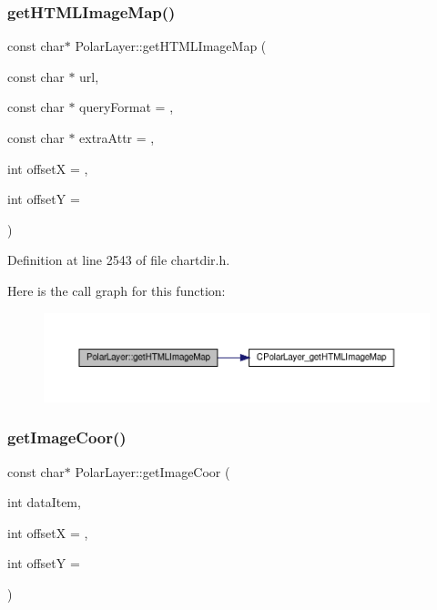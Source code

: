 \subsubsection{\texorpdfstring{get\+H\+T\+M\+L\+Image\+Map()}{getHTMLImageMap()}}
{\footnotesize\ttfamily const char$\ast$ Polar\+Layer\+::get\+H\+T\+M\+L\+Image\+Map (\begin{DoxyParamCaption}\item[{const char $\ast$}]{url,  }\item[{const char $\ast$}]{query\+Format = {},  }\item[{const char $\ast$}]{extra\+Attr = {},  }\item[{int}]{offsetX = {},  }\item[{int}]{offsetY = {} }\end{DoxyParamCaption})\hspace{0.3cm}{\ttfamily [inline]}}



Definition at line 2543 of file chartdir.\+h.

Here is the call graph for this function\+:
\nopagebreak
\begin{figure}[H]
\begin{center}
\leavevmode
\includegraphics[width=350pt]{class_polar_layer_aa9ce8e1ae886b67e135b1723ba00b745_cgraph}
\end{center}
\end{figure}
\mbox{\label{class_polar_layer_a06d7ebff644bdcbae6381e8d37d5a5bf}} 
\subsubsection{\texorpdfstring{get\+Image\+Coor()}{getImageCoor()}}
{\footnotesize\ttfamily const char$\ast$ Polar\+Layer\+::get\+Image\+Coor (\begin{DoxyParamCaption}\item[{int}]{data\+Item,  }\item[{int}]{offsetX = {},  }\item[{int}]{offsetY = {} }\end{DoxyParamCaption})\hspace{0.3cm}{\ttfamily [inline]}}



